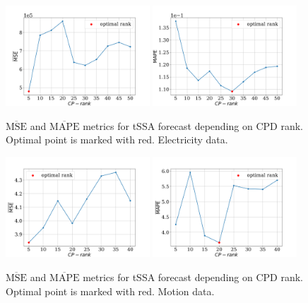 \documentclass[referee, pdflatex, sn-mathphys-num]{sn-jnl}
\theoremstyle{definition}
\theoremstyle{plain}
\begin{document}
	\begin{figure}[h]
		\centering
		\includegraphics[width=0.48\textwidth, keepaspectratio]{pred_MSE_rank_elec.png}
		\includegraphics[width=0.48\textwidth, keepaspectratio]{pred_MAPE_rank_elec.png}
		\caption{$ \overline{\text{MSE}} $ and $ \overline{\text{MAPE}} $ metrics for tSSA forecast depending on CPD rank. Optimal point is marked with red. Electricity data.}\label{fig:mse_mape_electr}
	\end{figure}
	
	\begin{figure}[h]
		\centering
		\includegraphics[width=0.48\textwidth, keepaspectratio]{pred_MSE_rank_motion.png}
		\includegraphics[width=0.48\textwidth, keepaspectratio]{pred_MAPE_rank_motion.png}
		\caption{$ \overline{\text{MSE}} $ and $ \overline{\text{MAPE}} $ metrics for tSSA forecast depending on CPD rank. Optimal point is marked with red. Motion data.}\label{fig:mse_mape_motion}
	\end{figure}
	
\end{document}
